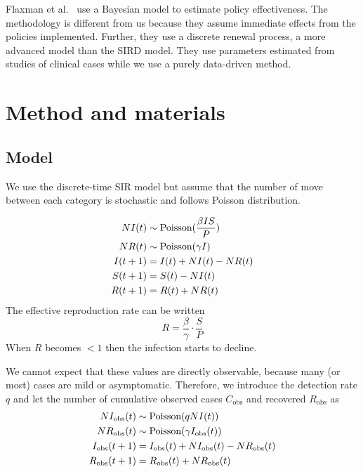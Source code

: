 \documentclass{amsart}
\begin{document}
Flaxman et al.~\cite{Flaxman2020} use a Bayesian model to estimate policy effectiveness.
The methodology is different from us because they assume immediate effects from the policies implemented.
Further, they use a discrete renewal process, a more advanced model than the SIRD model.
They use parameters estimated from studies of clinical cases while we use a purely data-driven method.

\section{Method and materials}

\subsection{Model}

We use the discrete-time SIR model but assume that the number of move between each category is stochastic and follows Poisson distribution.

\begin{align}
 NI(t) &\sim \textup{Poisson}(\frac{\beta I S}{P})\\
 NR(t) &\sim \textup{Poisson}(\gamma I)\\
 I(t+1) &= I(t) + NI(t) - NR(t)\\
 S(t+1) &= S(t) - NI(t)\\
 R(t+1) &= R(t) + NR(t)
\end{align}
The effective reproduction rate can be written
\begin{equation}
 R = \frac{\beta}{\gamma} \cdot \frac{S}{P}
\end{equation}
When $R$ becomes $<1$ then the infection starts to decline.

We cannot expect that these values are directly observable, because many (or most) cases are mild or asymptomatic.
Therefore, we introduce the detection rate $q$ and let the number of cumulative observed cases $C_{\text{obs}}$ and recovered $R_{\text{obs}}$ as
\begin{align}
 NI_{\text{obs}}(t) &\sim \textup{Poisson}(q NI(t))\\
 NR_{\text{obs}}(t) &\sim \textup{Poisson}(\gamma I_{\text{obs}}(t))\\
 I_{\text{obs}}(t+1) &= I_{\text{obs}}(t) + NI_{\text{obs}}(t) - NR_{\text{obs}}(t)\\
 R_{\text{obs}}(t+1) &= R_{\text{obs}}(t) + NR_{\text{obs}}(t)
\end{align}
\end{document}
